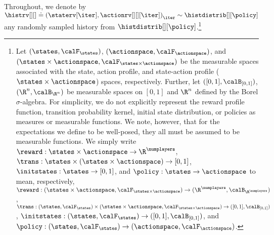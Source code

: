 Throughout, we denote by $\histrv[][] \doteq \left( \staterv[\iter], \actionrv[][][\iter] \right)_\iter \sim \histdistrib[][\policy]$ any randomly sampled history from $\histdistrib[][\policy]$.\footnote{Let $(\states, \calF_{\states})$, $(\actionspace, \calF_{\actionspace})$, and $(\states \times \actionspace, \calF_{\states \times \actionspace})$ be the measurable spaces associated with the state, action profile, and state-action profile ($\states \times \actionspace$) spaces, respectively. 
Further, let $([0,1], \calB_{[0,1]})$, $(\R^n, \calB_{\R^n})$ be measurable spaces on $[0,1]$ and $\R^n$ defined by the Borel $\sigma$-algebra. 
For simplicity, we do not explicitly represent the reward profile function, transition probability kernel, initial state distribution, or policies as measures or measurable functions.
We note, however, that for the expectations we define to be well-posed, 
they all must be assumed to be measurable functions.
We simply write $\reward: \states \times \actionspace \to \R^\numplayers$, $\trans: \states \times (\states \times \actionspace) \to [0,1]$, $\initstates: \states \to [0,1]$, and $\policy: \states \to \actionspace$ to mean, respectively, $\reward: (\states \times \actionspace, \calF_{\states \times \actionspace}) \to (\R^\numplayers, \calB_{\R^\numplayers})$, $\trans: (\states, \calF_{\states}) \times (\states \times \actionspace, \calF_{\states \times \actionspace}) \to ([0,1], \calB_{[0,1]})$, $\initstates: (\states, \calF_{\states}) \to ([0,1], \calB_{[0,1]})$, and $\policy: (\states, \calF_{\states}) \to (\actionspace, \calF_{\actionspace})$.}

